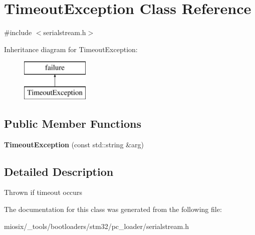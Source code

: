 \hypertarget{class_timeout_exception}{\section{Timeout\-Exception Class Reference}
\label{class_timeout_exception}
}


{\ttfamily \#include $<$serialstream.\-h$>$}

Inheritance diagram for Timeout\-Exception\-:\begin{figure}[H]
\begin{center}
\leavevmode
\includegraphics[height=2.000000cm]{class_timeout_exception}
\end{center}
\end{figure}
\subsection*{Public Member Functions}
\begin{DoxyCompactItemize}
\item 
\hypertarget{class_timeout_exception_a92bca482d3d318b4aadd007411e1b115}{{\bfseries Timeout\-Exception} (const std\-::string \&arg)}\label{class_timeout_exception_a92bca482d3d318b4aadd007411e1b115}

\end{DoxyCompactItemize}


\subsection{Detailed Description}
Thrown if timeout occurs 

The documentation for this class was generated from the following file\-:\begin{DoxyCompactItemize}
\item 
miosix/\-\_\-tools/bootloaders/stm32/pc\-\_\-loader/serialstream.\-h\end{DoxyCompactItemize}
